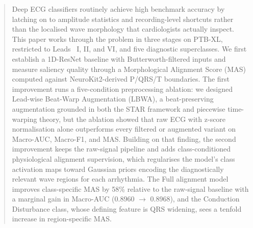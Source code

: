 \documentclass{article}
\begin{document}

\begin{abstract}
Deep ECG classifiers routinely achieve high benchmark accuracy by
latching on to amplitude statistics and recording-level shortcuts
rather than the localised wave morphology that cardiologists actually
inspect. This paper works through the problem in three stages on
PTB-XL, restricted to Leads~ I, II, and VI, and five diagnostic superclasses. We
first establish a 1D-ResNet baseline with Butterworth-filtered inputs
and measure saliency quality through a Morphological Alignment Score
(MAS) computed against NeuroKit2-derived P/QRS/T boundaries. The
first improvement runs a five-condition preprocessing ablation: we
designed Lead-wise Beat-Warp Augmentation (LBWA), a beat-preserving
augmentation grounded in both the STAR framework and piecewise time-warping
theory, but the ablation showed that raw ECG with z-score normalisation
alone outperforms every filtered or augmented variant on Macro-AUC,
Macro-F1, and MAS. Building on that finding, the second improvement
keeps the raw-signal pipeline and adds class-conditioned physiological
alignment supervision, which regularises the model's class activation
maps toward Gaussian priors encoding the diagnostically relevant wave
regions for each arrhythmia. The Full alignment model improves
class-specific MAS by 58\% relative to the raw-signal baseline with
a marginal gain in Macro-AUC (0.8960 $\to$ 0.8968), and the
Conduction Disturbance class, whose defining feature is QRS widening,
sees a tenfold increase in region-specific MAS.
\end{abstract}

\end{document}
